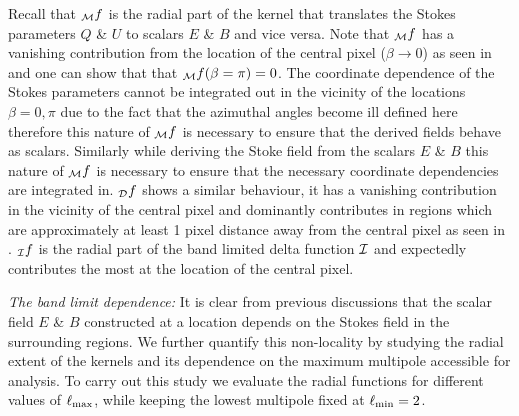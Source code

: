 %
Recall that ${_{\mathcal{M}}f}$ is the radial part of the kernel that translates the Stokes parameters $Q$ \& $U$ to scalars $E$ \& $B$ and vice versa. Note that ${_{\mathcal{M}}f}$ has a vanishing contribution from the location of the central pixel ($\beta \rightarrow 0$) as seen in  and one can show that that ${_{\mathcal{M}}f(\beta=\pi)}=0$. The coordinate dependence of the Stokes parameters cannot be integrated out in the vicinity of the locations $\beta=0,\pi$ due to the fact that the azimuthal angles become ill defined here therefore this nature of ${_{\mathcal{M}}f}$ is necessary to ensure that the derived fields behave as scalars. Similarly while deriving the Stoke field from the scalars $E$ \& $B$ this nature of ${_{\mathcal{M}}f}$ is necessary to ensure that the necessary coordinate dependencies are integrated in. ${_{\mathcal{D}}f}$ shows a similar behaviour, it has a vanishing contribution in the vicinity of the central pixel and dominantly contributes in regions which are approximately at least 1 pixel distance away from the central pixel as seen in . ${_{\mathcal{I}}f}$ is the radial part of the band limited delta function $\mathcal{I}$ and expectedly contributes the most at the location of the central pixel. 


\noindent \textit{The band limit dependence:} It is clear from previous discussions that the scalar field $E$ \& $B$ constructed at a location depends on the Stokes field in the surrounding regions. We further quantify this non-locality by studying the radial extent of the kernels and its dependence on the maximum multipole accessible for analysis. To carry out this study we evaluate the radial functions for different values of $\ell_{\rm max}$, while keeping the lowest multipole fixed at $\ell_{\rm min}=2$. 

